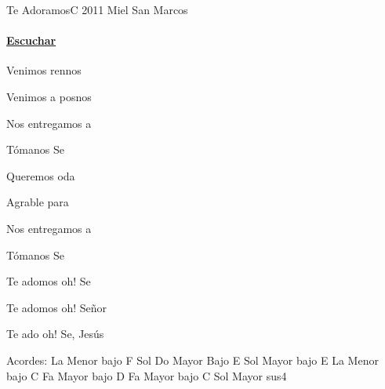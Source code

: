 \documentclass[12pt, spanish]{book}
\begin{document}
    \begin{song}{Te Adoramos}{C}
    {2011} %
    {Miel San Marcos}
    {} %
    {}
        \ifChordBk
        \paragraph{\mbox{}\hfill\protect\href{https://open.spotify.com/intl-es/track/5I8QguZcUBzaBvsvHshiMi}{Escuchar}\mbox{}\hfill}
        \fi



            \begin{SBOpGroup}
                Venimos  rennos

                Venimos a posnos

                Nos entregamos  a 

                Tómanos Se
            \end{SBOpGroup}
            \vskip 20pt
            \begin{SBOpGroup}
                Queremos  oda

                Agrable para 

                Nos entregamos  a 

                Tómanos Se
            \end{SBOpGroup}

            \begin{SBChorus}
                Te adomos oh! Se

                Te adomos oh! Señor

                Te ado oh! Se, Jesús
            \end{SBChorus}

        \ifChordBk
        \begin{SBOpGroup}
            Acordes:\break
            \upchord{\AmF}\qquad La Menor bajo F \hfill
            \upchord{\G}\qquad Sol \hfill\null\break
            \upchord{\CE}\qquad Do Mayor Bajo E  \hfill
            \upchord{\GE}\qquad Sol Mayor bajo E \hfill\null\break
            \upchord{\AmC}\qquad La Menor bajo C \hfill
            \upchord{\FD}\qquad Fa Mayor bajo D \hfill\null\break
            \upchord{\FC}Fa Mayor bajo C \hfill
            \upchord{\Gsus}\qquad Sol Mayor sus4 \hfill\null\break
        \end{SBOpGroup}
        \fi
    \end{song}
\end{document}
